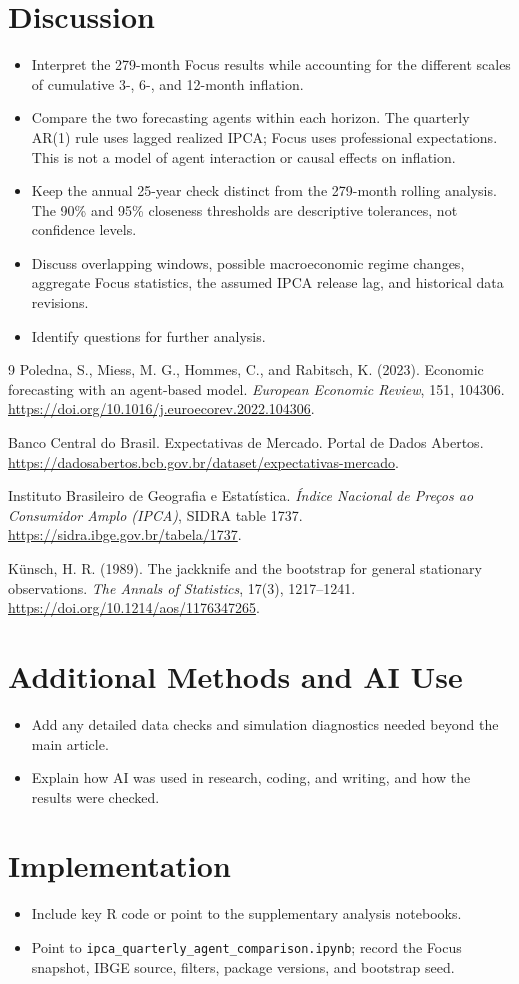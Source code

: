 \documentclass[11pt,a4paper]{article}
\begin{document}
\section{Discussion}
\begin{itemize}
  \item Interpret the 279-month Focus results while accounting for the different scales of cumulative 3-, 6-, and 12-month inflation.
  \item Compare the two forecasting agents within each horizon. The quarterly AR(1) rule uses lagged realized IPCA; Focus uses professional expectations. This is not a model of agent interaction or causal effects on inflation.
  \item Keep the annual 25-year check distinct from the 279-month rolling analysis. The 90\% and 95\% closeness thresholds are descriptive tolerances, not confidence levels.
  \item Discuss overlapping windows, possible macroeconomic regime changes, aggregate Focus statistics, the assumed IPCA release lag, and historical data revisions.
  \item Identify questions for further analysis.
\end{itemize}

\begin{thebibliography}{9}
Poledna, S., Miess, M. G., Hommes, C., and Rabitsch, K. (2023).
Economic forecasting with an agent-based model.
\emph{European Economic Review}, 151, 104306.
\url{https://doi.org/10.1016/j.euroecorev.2022.104306}.

Banco Central do Brasil. Expectativas de Mercado.
Portal de Dados Abertos.
\url{https://dadosabertos.bcb.gov.br/dataset/expectativas-mercado}.

Instituto Brasileiro de Geografia e Estat\'istica.
\emph{\'Indice Nacional de Pre\c{c}os ao Consumidor Amplo (IPCA)}, SIDRA table 1737.
\url{https://sidra.ibge.gov.br/tabela/1737}.

K\"unsch, H. R. (1989).
The jackknife and the bootstrap for general stationary observations.
\emph{The Annals of Statistics}, 17(3), 1217--1241.
\url{https://doi.org/10.1214/aos/1176347265}.
\end{thebibliography}

\appendix
\section{Additional Methods and AI Use}
\begin{itemize}
  \item Add any detailed data checks and simulation diagnostics needed beyond the main article.
  \item Explain how AI was used in research, coding, and writing, and how the results were checked.
\end{itemize}

\section{Implementation}
\begin{itemize}
  \item Include key R code or point to the supplementary analysis notebooks.
  \item Point to \texttt{ipca\_quarterly\_agent\_comparison.ipynb}; record the Focus snapshot, IBGE source, filters, package versions, and bootstrap seed.
\end{itemize}
\end{document}
